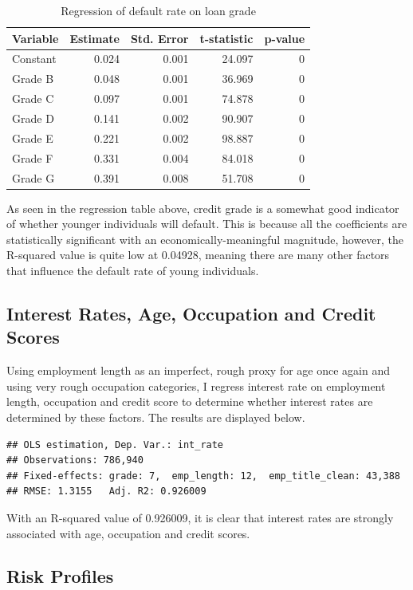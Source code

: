 \documentclass[11pt,preprint]{elsarticle}
\numberwithin{equation}{section}
\numberwithin{figure}{section}
\numberwithin{table}{section}
\begin{document}
\begin{longtable}[t]{lrrrr}
\caption{\label{tab:unnamed-chunk-11}Regression of default rate on loan grade}\\
\toprule
Variable & Estimate & Std. Error & t-statistic & p-value\\
\midrule
Constant & 0.024 & 0.001 & 24.097 & 0\\
Grade B & 0.048 & 0.001 & 36.969 & 0\\
Grade C & 0.097 & 0.001 & 74.878 & 0\\
Grade D & 0.141 & 0.002 & 90.907 & 0\\
Grade E & 0.221 & 0.002 & 98.887 & 0\\
\addlinespace
Grade F & 0.331 & 0.004 & 84.018 & 0\\
Grade G & 0.391 & 0.008 & 51.708 & 0\\
\bottomrule
\end{longtable}

As seen in the regression table above, credit grade is a somewhat good
indicator of whether younger individuals will default. This is because
all the coefficients are statistically significant with an
economically-meaningful magnitude, however, the R-squared value is quite
low at 0.04928, meaning there are many other factors that influence the
default rate of young individuals.

\subsection{Interest Rates, Age, Occupation and Credit
Scores}\label{interest-rates-age-occupation-and-credit-scores}

Using employment length as an imperfect, rough proxy for age once again
and using very rough occupation categories, I regress interest rate on
employment length, occupation and credit score to determine whether
interest rates are determined by these factors. The results are
displayed below.

\begin{verbatim}
## OLS estimation, Dep. Var.: int_rate
## Observations: 786,940
## Fixed-effects: grade: 7,  emp_length: 12,  emp_title_clean: 43,388
## RMSE: 1.3155   Adj. R2: 0.926009
\end{verbatim}

With an R-squared value of 0.926009, it is clear that interest rates are
strongly associated with age, occupation and credit scores.

\subsection{Risk Profiles}\label{risk-profiles}
\end{document}
